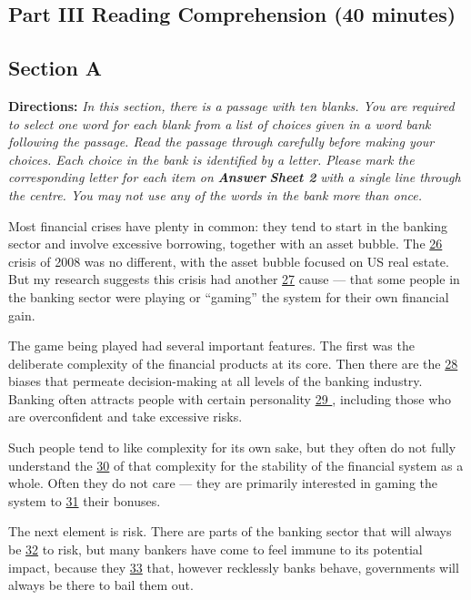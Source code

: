 \documentclass[UTF8,11pt]{ctexart}
\begin{document}
\subsection*{\textbf{Part III Reading Comprehension (40 minutes)}}


\subsection*{\textbf{Section A}}


\textbf{Directions:} \textit{In this section, there is a passage with ten blanks. You are required to select one word for each blank from a} \textit{list of choices given in a word bank following the passage. Read the passage through carefully before making your} \textit{choices. Each choice in the bank is identified by a letter. Please mark the corresponding letter for each item on }\textbf{\textit{Answer}} \textbf{\textit{Sheet 2}}\textit{ with a single line through the centre. You may not use any of the words in the bank more than once.}


Most financial crises have plenty in common: they tend to start in the banking sector and involve excessive borrowing, together with an asset bubble. The \uline{26} crisis of 2008 was no different, with the asset bubble focused on US real estate. But my research suggests this crisis had another \uline{27} cause — that some people in the banking sector were playing or “gaming” the system for their own financial gain.


The game being played had several important features. The first was the deliberate complexity of the financial products at its core. Then there are the \uline{28} biases that permeate decision-making at all levels of the banking industry. Banking often attracts people with certain personality \uline{29 }, including those who are overconfident and take excessive risks.


Such people tend to like complexity for its own sake, but they often do not fully understand the \uline{30} of that complexity for the stability of the financial system as a whole. Often they do not care — they are primarily interested in gaming the system to \uline{31} their bonuses.


The next element is risk. There are parts of the banking sector that will always be \uline{32} to risk, but many bankers have come to feel immune to its potential impact, because they \uline{33} that, however recklessly banks behave, governments will always be there to bail them out.
\end{document}
